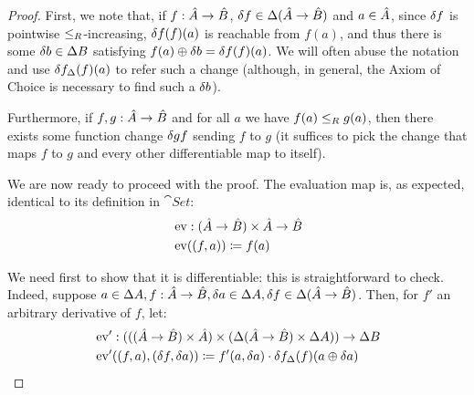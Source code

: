 \begin{proof}
  First, we note that, if $f : \hat{A} \rightarrow \hat{B}$, $\delta f \in \Delta (\hat{A} \rightarrow \hat{B})$
  and $a \in \hat{A}$, since $\delta f$ is pointwise $\leq_R$-increasing, $\delta f(f)(a)$ is reachable
  from $f(a)$, and thus there is some $\delta b \in \Delta B$ satisfying $f(a) \oplus \delta b = \delta f(f)(a)$.
  We will often abuse the notation and use $\delta f_\Delta(f)(a)$ to refer such a change (although, in general, the Axiom
  of Choice is necessary to find such a $\delta b$).


  Furthermore, if $f, g : \hat{A} \rightarrow \hat{B}$ and for all $a$ we have $f(a) \leq_R g(a)$, then there exists
  some function change $\delta gf$ sending $f$ to $g$ (it suffices to pick the change that maps $f$ to $g$ and every other
  differentiable map to itself).

  We are now ready to proceed with the proof. The evaluation map is, as expected, identical to its definition in $\cat{Set}$:
  \begin{align*}
    &\operatorname{ev} : (\hat{A} \rightarrow \hat{B}) \times \hat{A} \rightarrow \hat{B}\\
    &\operatorname{ev}((f, a)) \coloneqq f(a)
  \end{align*}

  We need first to show that it is differentiable: this is straightforward to check. Indeed, suppose 
  $a \in \Delta A, f : \hat{A} \rightarrow \hat{B}, \delta a \in \Delta A, \delta f \in \Delta (\hat{A} \rightarrow \hat{B})$.
  Then, for $f'$ an arbitrary derivative of $f$, let:
  \begin{align*}
    &\operatorname{ev}' : (((\hat{A} \rightarrow \hat{B}) \times \hat{A}) \times (\Delta (\hat{A} \rightarrow \hat{B}) \times \Delta A)) \rightarrow \Delta B\\
    &\operatorname{ev}'((f, a), (\delta f, \delta a)) \coloneqq f'(a, \delta a) \cdot \delta f_\Delta(f)(a \oplus \delta a)
  \end{align*}


\end{proof}
